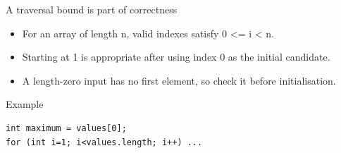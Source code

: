 \documentclass[10pt,aspectratio=169]{beamer}
\begin{document}
\begin{frame}[fragile,t]{A traversal bound is part of correctness}
\begin{itemize}
\item For an array of length n, valid indexes satisfy 0 \textless{}= i \textless{} n.
\item Starting at 1 is appropriate after using index 0 as the initial candidate.
\item A length-zero input has no first element, so check it before initialisation.
\end{itemize}
\vspace{1mm}\begin{block}{Example}
\begin{lstlisting}
int maximum = values[0];
for (int i=1; i<values.length; i++) ...
\end{lstlisting}
\end{block}
\end{frame}
\end{document}
